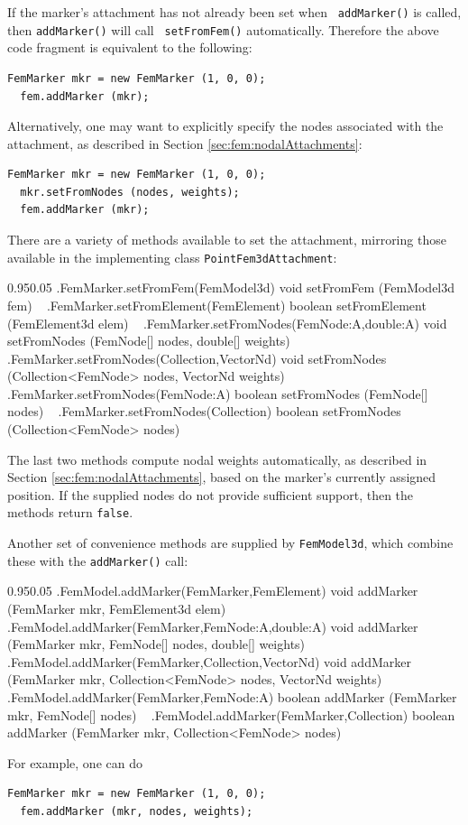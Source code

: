 If the marker's attachment has not already been set when {\tt
addMarker()} is called, then {\tt addMarker()} will call {\tt
setFromFem()} automatically. Therefore the above code fragment is
equivalent to the following:
%
\begin{lstlisting}[]
  FemMarker mkr = new FemMarker (1, 0, 0);
  fem.addMarker (mkr);
\end{lstlisting}
%
Alternatively, one may want to explicitly specify the nodes
associated with the attachment, as described in Section 
\ref{sec:fem:nodalAttachments}:
%
\begin{lstlisting}[]
  FemMarker mkr = new FemMarker (1, 0, 0);
  mkr.setFromNodes (nodes, weights);
  fem.addMarker (mkr);
\end{lstlisting}
%
There are a variety of methods available to set the attachment, mirroring
those available in the implementing class {\tt PointFem3dAttachment}:
\begin{methodtable}{0.95}{0.05}
\midline
%
\methodentry
{\fem.FemMarker.setFromFem(FemModel3d)}%
{void setFromFem (FemModel3d fem)}%
{\ }%
%
\methodentry
{\fem.FemMarker.setFromElement(FemElement)}%
{boolean setFromElement (FemElement3d elem)}%
{\ }%
%
\methodentry
{\fem.FemMarker.setFromNodes(FemNode:A,double:A)}%
{void setFromNodes (FemNode[] nodes, double[] weights)}%
{\ }%
%
\methodentry
{\fem.FemMarker.setFromNodes(Collection,VectorNd)}%
{void setFromNodes (Collection<FemNode> nodes, VectorNd weights)}%
{\ }%
%
\methodentry
{\fem.FemMarker.setFromNodes(FemNode:A)}%
{boolean setFromNodes (FemNode[] nodes)}%
{\ }%
%
\methodentry
{\fem.FemMarker.setFromNodes(Collection)}%
{boolean setFromNodes (Collection<FemNode> nodes)}%
{\ }%
%
\midline
\end{methodtable}
The last two methods compute nodal weights automatically, as described
in Section \ref{sec:fem:nodalAttachments}, based on the marker's
currently assigned position. If the supplied nodes do not provide
sufficient support, then the methods return {\tt false}.

Another set of convenience methods are supplied by {\tt FemModel3d},
which combine these with the {\tt addMarker()} call:
%
\begin{methodtable}{0.95}{0.05}
\midline
%
\methodentry
{\fem.FemModel.addMarker(FemMarker,FemElement)}%
{void addMarker (FemMarker mkr, FemElement3d elem)}%
{\ }%
%
\methodentry
{\fem.FemModel.addMarker(FemMarker,FemNode:A,double:A)}%
{void addMarker (FemMarker mkr, FemNode[] nodes, double[] weights)}%
{\ }%
%
\methodentry
{\fem.FemModel.addMarker(FemMarker,Collection,VectorNd)}%
{void addMarker (FemMarker mkr, Collection<FemNode> nodes, VectorNd weights)}%
{\ }%
%
\methodentry
{\fem.FemModel.addMarker(FemMarker,FemNode:A)}%
{boolean addMarker (FemMarker mkr, FemNode[] nodes)}%
{\ }%
%
\methodentry
{\fem.FemModel.addMarker(FemMarker,Collection)}%
{boolean addMarker (FemMarker mkr, Collection<FemNode> nodes)}%
{\ }%
%
\midline
\end{methodtable}
%
For example, one can do
%
\begin{lstlisting}[]
  FemMarker mkr = new FemMarker (1, 0, 0);
  fem.addMarker (mkr, nodes, weights);
\end{lstlisting}
%

